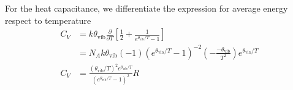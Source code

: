 \documentclass[../../../Main.tex]{subfiles}
\begin{document}
For the heat capacitance, we differentiate the expression for average energy respect to temperature
\begin{align*}
	C_V & =k\theta_\text{vib}\frac{\partial}{\partial T}\left[\frac{1}{2}+\frac{1}{e^{\theta_\text{vib}/T}-1}\right]                     \\
	    & =N_Ak\theta_\text{vib} (-1)(e^{\theta_\text{vib}/T}-1)^{-2}\left(-\frac{-\theta_\text{vib}}{T^2}\right)e^{\theta_\text{vib}/T} \\
	C_V & =\frac{(\theta_\text{vib}/T)^2e^{\theta_\text{vib}/T}}{(e^{\theta_\text{vib}/T}-1)^2}R
\end{align*}
\end{document}
